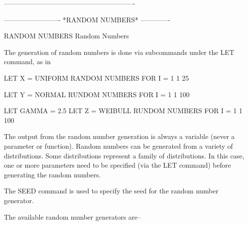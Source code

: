 ----------------------------------------------------------
 
 
 
 
 
 
 
 
 
 
 
 
 
 
 
 
 
 
 
 
 
 
 
 
 
 
 
 

 
-------------------------  *RANDOM NUMBERS*  -------------
 
RANDOM NUMBERS
Random Numbers
 
The generation of random numbers is done via subcommands under the LET
command, as in
 
   LET X = UNIFORM RANDOM NUMBERS FOR I = 1 1 25
 
   LET Y = NORMAL RUNDOM NUMBERS FOR I = 1 1 100
 
   LET GAMMA = 2.5
   LET Z = WEIBULL RUNDOM NUMBERS FOR I = 1 1 100
 
The output from the random number generation is always a variable
(never a parameter or function).  Random numbers can be generated from
a variety of distributions.  Some distributions represent a family of
distributions.  In this case, one or more parameters need to be
specified (via the LET command) before generating the random numbers.
 
The SEED command is used to specify the seed for the random number
generator.
 
The available random number generators are--
 
